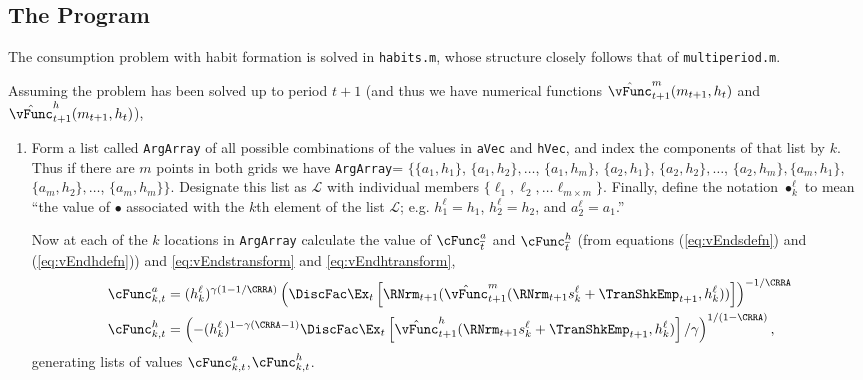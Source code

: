 \documentclass[\econtexRoot/SolvingMicroDSOPs]{subfiles}
\begin{document}
\hypertarget{The-Program}{}
\subsection{The Program}
The consumption problem with habit formation is solved in
\texttt{habits.m}, whose structure closely follows that of
\texttt{multiperiod.m}.

Assuming the problem has been solved up to period $t+1$ (and thus we
have numerical functions $\hat{\vFunc}_{t+1}^{m}(m_{t+1},h_{t})$ and
$\hat{\vFunc}_{t+1}^{h}(m_{t+1},h_{t})$),
\begin{enumerate}

\item Form a list called \texttt{ArgArray} of all possible
  combinations of the values in \texttt{aVec} and
  \texttt{hVec}, and index the components of that list by $k$.  Thus
  if there are $m$ points in both grids we have \texttt{ArgArray}=
  $\{\{{a}_{1},h_{1}\}$, $\{{a}_{1},h_{2}\},\ldots$,
  $\{{a}_{1},h_{m}\}$, $\{{a}_{2},h_{1}\}$,
  $\{{a}_{2},h_{2}\},\ldots$, $\{{a}_{2},h_{m}\},
  \{{a}_{m},h_{1}\}$, $\{{a}_{m},h_{2}\},\ldots$,
  $\{{a}_{m},h_{m}\}\}$.  Designate this list as $\mathcal{L}$
  with individual members $\{\ell_{1}, \ell_{2}, \ldots \ell_{m \times
    m}\}$.  Finally, define the notation $\bullet^{\ell}_{k}$ to mean
  ``the value of $\bullet$ associated with the $k$th element of the
  list $\mathcal{L}$; e.g. $h^{\ell}_{1} = h_{1}$, $h^{\ell}_{2} =
  h_{2}$, and $a^{\ell}_{2}={a}_{1}$.''

  Now at each of the $k$ locations in \texttt{ArgArray} calculate the
  value of $\cFunc_{\overline{t}}^{a}$ and $\cFunc_{\overline{t}}^{h}$ (from
  equations (\ref{eq:vEndsdefn}) and (\ref{eq:vEndhdefn})) and
  \eqref{eq:vEndstransform} and \eqref{eq:vEndhtransform},
  \begin{equation}\begin{gathered}\begin{aligned}
    \cFunc_{k,t}^a  & = (h_{k}^{\ell})^{\gamma(1-1/\CRRA)}
                             \left(\DiscFac \Ex_{t}
                             \left[
                             \RNrm_{t+1} (\hat{\vFunc}_{t+1}^{m}(\RNrm_{t+1} s^{\ell}_{k} +
                             {\TranShkEmp}_{t+1},h^{\ell}_{k}))
                             \right]
                             \right)^{-1/\CRRA}
    \\      \cFunc_{k,t}^{h}
                           & =                                         \left(-(h_{k}^{\ell})^{1-\gamma(\CRRA-1)} \DiscFac \Ex_{t}
                             \left[
                             \hat{\vFunc}_{t+1}^{h}(\RNrm_{t+1} s^{\ell}_{k} +
                             {\TranShkEmp}_{t+1},h^{\ell}_{k})
                             \right]/\gamma
                             \right)^{1/(1-\CRRA)},
  \end{aligned}\end{gathered}\end{equation}
generating lists of values
$\cFunc^{a}_{k,t}$,$\cFunc^{h}_{k,t}$.


\end{enumerate}
\end{document}
